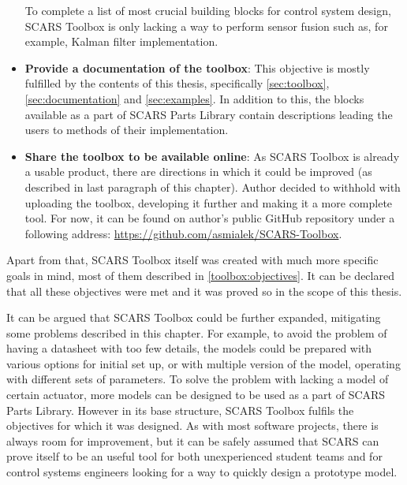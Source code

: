 \begin{itemize}
        To complete a list of most crucial building blocks for control system design, SCARS Toolbox is only lacking a way to perform sensor fusion such as, for example, Kalman filter implementation.
        \item \textbf{Provide a documentation of the toolbox}: This objective is mostly fulfilled by the contents of this thesis, specifically \autoref{sec:toolbox}, \autoref{sec:documentation} and \autoref{sec:examples}. In addition to this, the blocks available as a part of SCARS Parts Library contain descriptions leading the users to methods of their implementation. 
        \item \textbf{Share the toolbox to be available online}: As SCARS Toolbox is already a usable product, there are directions in which it could be improved (as described in last paragraph of this chapter). Author decided to withhold with uploading the toolbox, developing it further and making it a more complete tool. For now, it can be found on author's public GitHub repository under a following address: \url{https://github.com/asmialek/SCARS-Toolbox}.
    \end{itemize}

    Apart from that, SCARS Toolbox itself was created with much more specific goals in mind, most of them described in \autoref{toolbox:objectives}. It can be declared that all these objectives were met and it was proved so in the scope of this thesis.

    It can be argued that SCARS Toolbox could be further expanded, mitigating some problems described in this chapter. For example, to avoid the problem of having a datasheet with too few details, the models could be prepared with various options for initial set up, or with multiple version of the model, operating with different sets of parameters. To solve the problem with lacking a model of certain actuator, more models can be designed to be used as a part of SCARS Parts Library. However in its base structure, SCARS Toolbox fulfils the objectives for which it was designed. As with most software projects, there is always room for improvement, but it can be safely assumed that SCARS can prove itself to be an useful tool for both unexperienced student teams and for control systems engineers looking for a way to quickly design a prototype model. 




